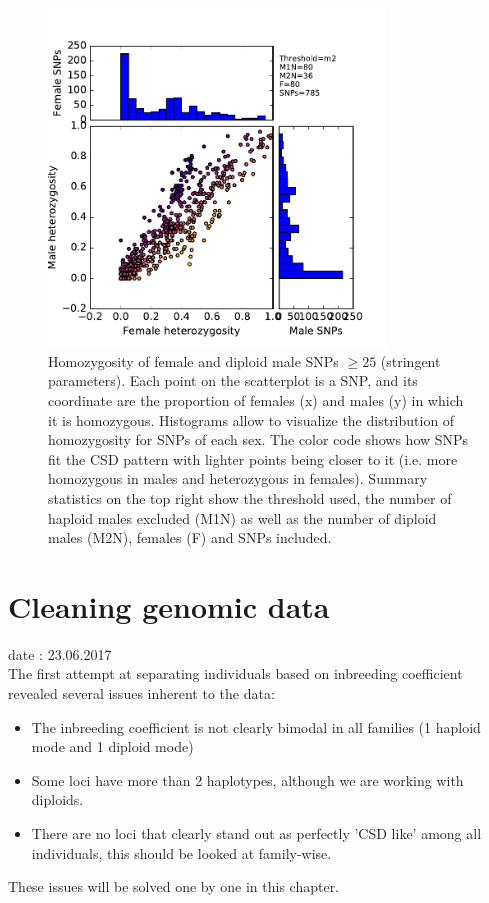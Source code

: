 \documentclass[10pt,a4paper]{report}
\begin{document}
\begin{figure}[h]
	\begin{center}
		\includegraphics[width=0.8\textwidth]{exclu_haplo/d25assoc_explo/m2}
		\caption{Homozygosity of female and diploid male SNPs $\geq 25$ (stringent parameters). Each point on the scatterplot is a SNP, and its coordinate are the proportion of females (x) and males (y) in which it is homozygous. Histograms allow to visualize the distribution of homozygosity for SNPs of each sex. The color code shows how SNPs fit the CSD pattern with lighter points being closer to it (i.e. more homozygous in males and heterozygous in females). Summary statistics on the top right show the threshold used, the number of haploid males excluded (M1N) as well as the number of diploid males (M2N), females (F) and SNPs included.}
		\label{SNPs_explo25}
	\end{center}
\end{figure}


\FloatBarrier

\chapter{Cleaning genomic data}

date : 23.06.2017
\\

The first attempt at separating individuals based on inbreeding coefficient revealed several issues inherent to the data:
\begin{itemize}
\item The inbreeding coefficient is not clearly bimodal in all families (1 haploid mode and 1 diploid mode)
\item Some loci have more than 2 haplotypes, although we are working with diploids.
\item There are no loci that clearly stand out as perfectly 'CSD like' among all individuals, this should be looked at family-wise.
\end{itemize}
These issues will be solved one by one in this chapter.
\end{document}
